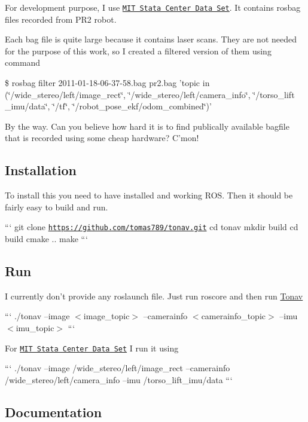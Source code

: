 For development purpose, I use \href{http://projects.csail.mit.edu/stata/index.php}{\tt M\-I\-T Stata Center Data Set}. It contains rosbag files recorded from P\-R2 robot.

Each bag file is quite large because it contains laser scans. They are not needed for the purpose of this work, so I created a filtered version of them using command

{\ttfamily \$ rosbag filter 2011-\/01-\/18-\/06-\/37-\/58.\-bag pr2.\-bag 'topic in (\char`\"{}/wide\-\_\-stereo/left/image\-\_\-rect\char`\"{}, \char`\"{}/wide\-\_\-stereo/left/camera\-\_\-info\char`\"{}, \char`\"{}/torso\-\_\-lift    \-\_\-imu/data\char`\"{}, \char`\"{}/tf\char`\"{}, \char`\"{}/robot\-\_\-pose\-\_\-ekf/odom\-\_\-combined\char`\"{})'}

By the way. Can you believe how hard it is to find publically available bagfile that is recorded using some cheap hardware? C'mon!

\subsection*{Installation}

To install this you need to have installed and working R\-O\-S. Then it should be fairly easy to build and run.

``` git clone \href{https://github.com/tomas789/tonav.git}{\tt https\-://github.\-com/tomas789/tonav.\-git} cd tonav mkdir build cd build cmake .. make ```

\subsection*{Run}

I currently don't provide any roslaunch file. Just run {\ttfamily roscore} and then run \hyperlink{class_tonav}{Tonav}

``` ./tonav --image $<$image\-\_\-topic$>$ --camerainfo $<$camerainfo\-\_\-topic$>$ --imu $<$imu\-\_\-topic$>$ ```

For \href{http://projects.csail.mit.edu/stata/index.php}{\tt M\-I\-T Stata Center Data Set} I run it using

``` ./tonav --image /wide\-\_\-stereo/left/image\-\_\-rect --camerainfo /wide\-\_\-stereo/left/camera\-\_\-info --imu /torso\-\_\-lift\-\_\-imu/data ```

\subsection*{Documentation}

